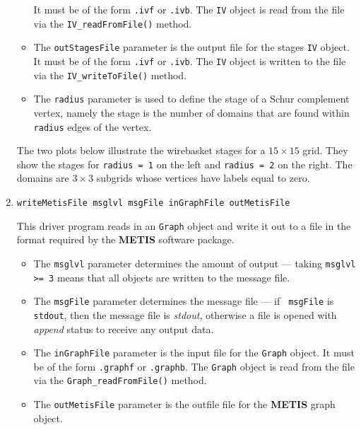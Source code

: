 \begin{enumerate}
\begin{itemize}
It must be of the form {\tt *.ivf} or {\tt *.ivb}.
The {\tt IV} object is read from the file via the
{\tt IV\_readFromFile()} method.
\item
The {\tt outStagesFile} parameter is the output file for the 
stages {\tt IV} object. 
It must be of the form {\tt *.ivf} or {\tt *.ivb}.
The {\tt IV} object is written to the file via the
{\tt IV\_writeToFile()} method.
\item
The {\tt radius} parameter is used to define the stage of a Schur
complement vertex, namely the stage is the number of domains that
are found within {\tt radius} edges of the vertex.
\end{itemize}
The two plots below illustrate the wirebasket stages for a $15
\times 15$ grid.
They show the stages for {\tt radius = 1} on the
left and {\tt radius = 2} on the right.
The domains are $3 \times 3$ subgrids whose vertices have labels
equal to zero.
\begin{center}
\end{center}
\item
\begin{verbatim}
writeMetisFile msglvl msgFile inGraphFile outMetisFile 
\end{verbatim}
This driver program reads in an {\tt Graph} object and write it out
to a file in the format required by the {\bf METIS} software
package.
\begin{itemize}
\item
The {\tt msglvl} parameter determines the amount of output ---
taking {\tt msglvl >= 3} means that all objects are written
to the message file.
\item
The {\tt msgFile} parameter determines the message file --- if {\tt
msgFile} is {\tt stdout}, then the message file is {\it stdout},
otherwise a file is opened with {\it append} status to receive any
output data.
\item
The {\tt inGraphFile} parameter is the input file for the {\tt Graph}
object. It must be of the form {\tt *.graphf} or {\tt *.graphb}.
The {\tt Graph} object is read from the file via the
{\tt Graph\_readFromFile()} method.
\item
The {\tt outMetisFile} parameter is the outfile file for the {\bf
METIS} graph object. 
\end{itemize}
\end{enumerate}
